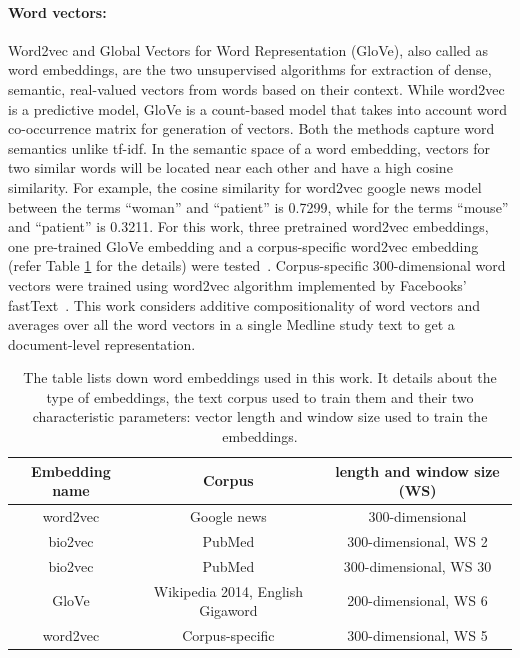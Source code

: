 \documentclass[]{spie}  %
\begin{document}
\paragraph{Word vectors: }
Word2vec and Global Vectors for Word Representation (GloVe), also called as word embeddings, are the two unsupervised algorithms for extraction of dense, semantic, real-valued vectors from words based on their context.
While word2vec is a predictive model, GloVe is a count-based model that takes into account word co-occurrence matrix for generation of vectors. 
Both the methods capture word semantics unlike tf-idf.
In the semantic space of a word embedding, vectors for two similar words will be located near each other and have a high cosine similarity.
For example, the cosine similarity for word2vec google news model between the terms ``woman'' and ``patient'' is 0.7299, while for the terms ``mouse'' and ``patient'' is 0.3211.
For this work, three pretrained word2vec embeddings, one pre-trained GloVe embedding and a corpus-specific word2vec embedding (refer Table \ref{tab:wordvectors} for the details) were tested~\cite{pennington2014glove, bio2vec}.
Corpus-specific 300-dimensional word vectors were trained using word2vec algorithm implemented by Facebooks' fastText~\cite{bojanowski2017enriching}.
This work considers additive compositionality of word vectors and averages over all the word vectors in a single Medline study text to get a document-level representation.
%
\vspace{5mm}
\begin{table}[ht]
\caption{The table lists down word embeddings used in this work. 
It details about the type of embeddings, the text corpus used to train them and their two characteristic parameters: vector length and window size used to train the embeddings.}
\label{tab:wordvectors}
    \centering
    \begin{tabular}{|c|c|c|}
    \hline
        Embedding name & Corpus & length and window size (WS)  \\
    \hline
        word2vec & Google news & 300-dimensional \\
        bio2vec & PubMed & 300-dimensional, WS 2\\
        bio2vec & PubMed & 300-dimensional, WS 30\\
        GloVe & Wikipedia 2014, English Gigaword & 200-dimensional, WS 6\\
        word2vec & Corpus-specific & 300-dimensional, WS 5\\
    \hline
    \end{tabular}
\end{table}
\vspace{5mm}
%
\end{document}
